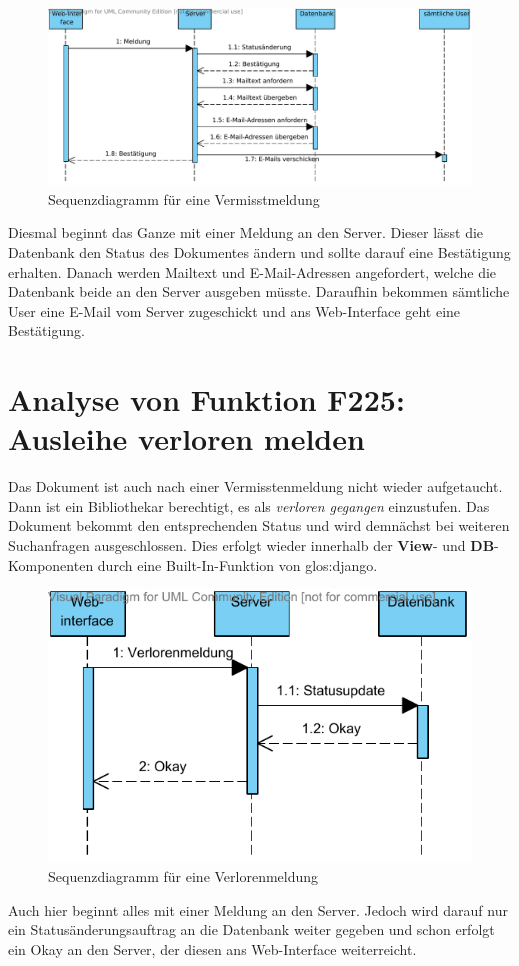 \begin{figure}[H]
\begin{center}
\includegraphics[width=0.9\linewidth]{bilder/Seq-Vermisst.pdf}
\caption{Sequenzdiagramm für eine Vermisstmeldung}
\label{fig:224}
\end{center}
\end{figure}
Diesmal beginnt das Ganze mit einer Meldung an den Server. Dieser lässt die Datenbank den Status des Dokumentes ändern und sollte darauf eine Bestätigung erhalten. Danach werden Mailtext und E-Mail-Adressen angefordert, welche die Datenbank beide an den Server ausgeben müsste. Daraufhin bekommen sämtliche User eine E-Mail vom Server zugeschickt und ans Web-Interface geht eine Bestätigung.

\section{Analyse von Funktion F225: Ausleihe verloren melden}
\label{f:225}
Das Dokument ist auch nach einer Vermisstenmeldung nicht wieder aufgetaucht. 
Dann ist ein Bibliothekar berechtigt, es als \emph{verloren gegangen} 
einzustufen. Das Dokument bekommt den entsprechenden Status und wird demnächst 
bei weiteren Suchanfragen ausgeschlossen. Dies erfolgt wieder innerhalb der 
\textbf{View}- und \textbf{DB}-Komponenten durch eine Built-In-Funktion von 
\gls{glos:django}.

\begin{figure}[H]
\begin{center}
\includegraphics[width=0.6\linewidth]{bilder/seq-verloren.pdf}
\caption{Sequenzdiagramm für eine Verlorenmeldung}
\label{fig:225}
\end{center}
\end{figure}
Auch hier beginnt alles mit einer Meldung an den Server. Jedoch wird darauf nur ein Statusänderungsauftrag an die Datenbank weiter gegeben und schon erfolgt ein Okay an den Server, der diesen ans Web-Interface weiterreicht.
